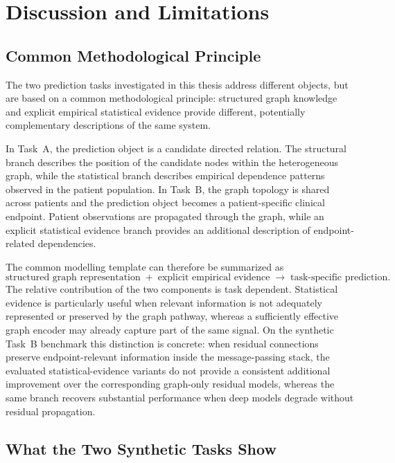 \chapter{Discussion and Limitations}
\label{ch:joint-discussion}

\section{Common Methodological Principle}
\label{sec:joint-shared}

The two prediction tasks investigated in this thesis address different objects, but are
based on a common methodological principle: structured graph knowledge and explicit
empirical statistical evidence provide different, potentially complementary descriptions
of the same system.

In Task~A, the prediction object is a candidate directed relation. The structural branch
describes the position of the candidate nodes within the heterogeneous graph, while the
statistical branch describes empirical dependence patterns observed in the patient
population. In Task~B, the graph topology is shared across patients and the prediction
object becomes a patient-specific clinical endpoint. Patient observations are propagated
through the graph, while an explicit statistical evidence branch provides an additional
description of endpoint-related dependencies.

The common modelling template can therefore be summarized as
\begin{equation}
\text{structured graph representation}
\;+\;
\text{explicit empirical evidence}
\;\rightarrow\;
\text{task-specific prediction}.
\end{equation}
The relative contribution of the two components is task dependent. Statistical evidence is
particularly useful when relevant information is not adequately represented or preserved
by the graph pathway, whereas a sufficiently effective graph encoder may already capture
part of the same signal.
On the synthetic Task~B benchmark this distinction is concrete: when residual connections
preserve endpoint-relevant information inside the message-passing stack, the evaluated
statistical-evidence variants do not provide a consistent additional improvement over the
corresponding graph-only residual models, whereas the same branch recovers substantial
performance when deep models degrade without residual propagation.

\section{What the Two Synthetic Tasks Show}
\label{sec:joint-synthetic}

